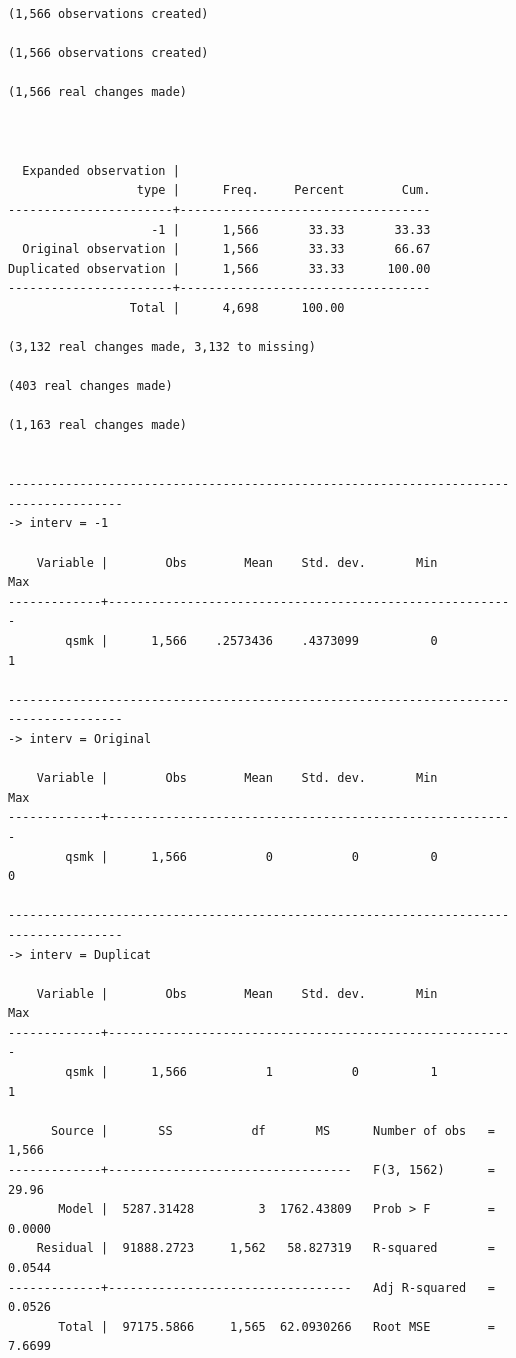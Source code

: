 \documentclass[
  10pt,
  a4paper,
]{book}
\begin{document}
\begin{verbatim}
(1,566 observations created)

(1,566 observations created)

(1,566 real changes made)



  Expanded observation |
                  type |      Freq.     Percent        Cum.
-----------------------+-----------------------------------
                    -1 |      1,566       33.33       33.33
  Original observation |      1,566       33.33       66.67
Duplicated observation |      1,566       33.33      100.00
-----------------------+-----------------------------------
                 Total |      4,698      100.00

(3,132 real changes made, 3,132 to missing)

(403 real changes made)

(1,163 real changes made)


--------------------------------------------------------------------------------------
-> interv = -1

    Variable |        Obs        Mean    Std. dev.       Min        Max
-------------+---------------------------------------------------------
        qsmk |      1,566    .2573436    .4373099          0          1

--------------------------------------------------------------------------------------
-> interv = Original

    Variable |        Obs        Mean    Std. dev.       Min        Max
-------------+---------------------------------------------------------
        qsmk |      1,566           0           0          0          0

--------------------------------------------------------------------------------------
-> interv = Duplicat

    Variable |        Obs        Mean    Std. dev.       Min        Max
-------------+---------------------------------------------------------
        qsmk |      1,566           1           0          1          1

      Source |       SS           df       MS      Number of obs   =     1,566
-------------+----------------------------------   F(3, 1562)      =     29.96
       Model |  5287.31428         3  1762.43809   Prob > F        =    0.0000
    Residual |  91888.2723     1,562   58.827319   R-squared       =    0.0544
-------------+----------------------------------   Adj R-squared   =    0.0526
       Total |  97175.5866     1,565  62.0930266   Root MSE        =    7.6699


\end{verbatim}
\end{document}

